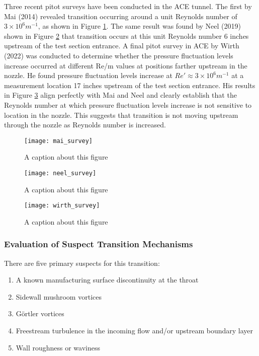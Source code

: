 Three recent pitot surveys have been conducted in the ACE tunnel. The first by Mai (2014) revealed transition occurring around a unit Reynolds number of $3 \times 10^6 m^{-1}$, as shown in Figure \ref{fig:mai_survey}. The same result was found by Neel (2019) shown in Figure \ref{fig:neel_survey} that transition occurs at this unit Reynolds number 6 inches upstream of the test section entrance. A final pitot survey in ACE by Wirth (2022) was conducted to determine whether the pressure fluctuation levels increase occurred at different Re/m values at positions farther upstream in the nozzle. He found pressure fluctuation levels increase at $Re' \approx 3 \times 10^6 m^{-1}$ at a measurement location 17 inches upstream of the test section entrance. His results in Figure \ref{fig:wirth_survey} align perfectly with Mai and Neel and clearly establish that the Reynolds number at which pressure fluctuation levels increase is not sensitive to location in the nozzle. This suggests that transition is not moving upstream through the nozzle as Reynolds number is increased.

\begin{figure}[ht]
    \centering
    \texttt{[image: mai\_survey]}
    \caption{A caption about this figure \cite{mai_dis}}
    \label{fig:mai_survey}
\end{figure}

\begin{figure}[ht]
    \centering
    \texttt{[image: neel\_survey]}
    \caption{A caption about this figure \cite{neel_dis}}
    \label{fig:neel_survey}
\end{figure}

\begin{figure}[ht]
    \centering
    \texttt{[image: wirth\_survey]}
    \caption{A caption about this figure}
    \label{fig:wirth_survey}
\end{figure}

\subsubsection{Evaluation of Suspect Transition Mechanisms}

There are five primary suspects for this transition:

\begin{enumerate}
    \item A known manufacturing surface discontinuity at the throat
    \item Sidewall mushroom vortices
    \item Görtler vortices
    \item Freestream turbulence in the incoming flow and/or upstream boundary layer
    \item Wall roughness or waviness
\end{enumerate}

